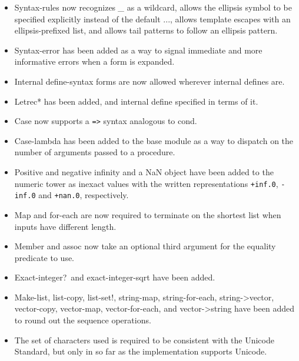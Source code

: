 \begin{itemize}
\item {\cf Syntax-rules} now recognizes {\em \_} as a wildcard, allows
the ellipsis symbol to be specified explicitly instead of the default
{\cf ...}, allows template escapes with an ellipsis-prefixed list, and
allows tail patterns to follow an ellipsis pattern.

\item {\cf Syntax-error} has been added as a way to signal immediate
and more informative errors when a form is expanded.

\item Internal {\cf define-syntax} forms are now allowed wherever
internal {\cf define}s are.

\item {\cf Letrec*} has been added, and internal define specified in
terms of it.

\item {\cf Case} now supports a {\tt =>} syntax analogous to {\cf cond}.

\item {\cf Case-lambda} has been added to the base module as a way to
dispatch on the number of arguments passed to a procedure.

\item Positive and negative infinity and a NaN object have been added
to the numeric tower as inexact values with the written
representations {\tt +inf.0}, {\tt -inf.0} and {\tt +nan.0},
respectively.

\item {\cf Map} and {\cf for-each} are now required to terminate on
the shortest list when inputs have different length.

\item {\cf Member} and {\cf assoc} now take an optional third argument
for the equality predicate to use.

\item {\cf Exact-integer?}\  and {\cf exact-integer-sqrt} have been added.

\item {\cf Make-list}, {\cf list-copy}, {\cf list-set!}, {\cf
string-map}, {\cf string-for-each}, {\cf string->vector}, {\cf
vector-copy}, {\cf vector-map}, {\cf vector-for-each}, and {\cf
vector->string} have been added to round out the sequence operations.

\item The set of characters used is required to be consistent with the
Unicode Standard, but only in so far as the implementation supports
Unicode.


\end{itemize}
